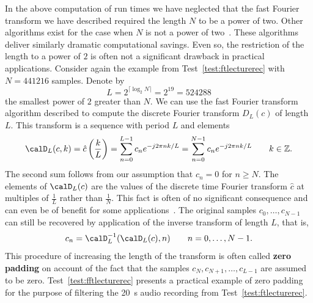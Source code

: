\documentclass[11pt,a4paper]{book}
\theoremstyle{plain}
\numberwithin{equation}{section}
\newcommand{\ints}{{\mathbb Z}}
\newcommand{\term}{\textbf}
\newcommand{\ceil}[1]{\lceil #1 \rceil}
\newcounter{test}
\begin{document}
In the above computation of run times we have neglected that the fast Fourier transform we have described required the length $N$ to be a power of two.  Other algorithms exist for the case when $N$ is not a power of two~\citep{Rader_fft_prime_1968,Bluestein_fft_prime_1968,FrigoJohnson_fftw_2005}.  These algorithms deliver similarly dramatic computational savings.  Even so, the restriction of the length to a power of $2$ is often not a significant drawback in practical applications.  Consider again the example from Test~\ref{test:ftlecturerec} with $N=441216$ samples.  Denote by 
\[
L = 2^{\ceil{\log_2 N}} = 2^{19} = 524288
\] 
the smallest power of $2$ greater than $N$.  We can use the fast Fourier transform algorithm described to compute the discrete Fourier transform $D_L(c)$ of length $L$.  This transform is a sequence with period $L$ and elements 
\[
\calD_L(c,k) = \hat{c}\left(\frac{k}{L}\right) = \sum_{n = 0}^{L-1} c_n e^{-j 2\pi n k/L} = \sum_{n = 0}^{N-1} c_n e^{-j 2\pi n k/L} \qquad k \in \ints.
\]
The second sum follows from our assumption that $c_n = 0$ for $n \geq N$.  The elements of $\calD_L(c)$ are the values of the discrete time Fourier transform $\hat{c}$ at multiples of $\tfrac{1}{L}$ rather than $\tfrac{1}{N}$.  This fact is often of no significant consequence and can even be of benefit for some applications~\citep{Quinn2001,Quinn2008maximizing_the_periodogram}.  The original samples $c_0, \dots, c_{N-1}$ can still be recovered by application of the inverse transform of length $L$, that is, 
\[
c_n = \calD_L^{-1}(\calD_L(c), n) \qquad  n = 0, \dots, N-1.
\]  
This procedure of increasing the length of the transform is often called \term{zero padding} on account of the fact that the samples $c_N, c_{N+1}, \dots, c_{L-1}$ are assumed to be zero.  Test~\ref{test:fftlecturerec} presents a practical example of zero padding for the purpose of filtering the \SI{20}{\second} audio recording from Test~\ref{test:ftlecturerec}.

\end{document}

